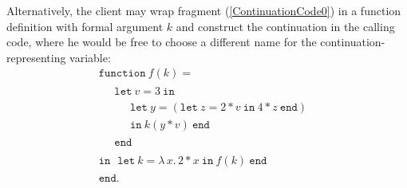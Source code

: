 Alternatively, the client may wrap fragment (\ref{ContinuationCode0})
in a function definition with formal argument $k$ and construct the
continuation in the calling code, where he would be free to choose a
different name for the continuation-representing variable:
\begin{equation}
\label{ContinuationCode1}
\begin{array}{l}
\texttt{function}\ f (k) =\\
\quad 
\begin{array}{l}
  \texttt{let}\ v = 3\ \texttt{in}\\
  \quad \begin{array}{l} 
    \texttt{let}\ y = (\texttt{let}\ z=2*v \ \texttt{in}\ 4*z\ \texttt{end})\\
    \texttt{in}\ k (y*v)\ \texttt{end}
  \end{array}\\
  \texttt{end}
  \end{array}\\
\texttt{in}\
  \begin{array}{l}
  \texttt{let}\ k = \lambda\, x .\, 2* x\ \texttt{in}\ f(k)\ \texttt{end}
  \end{array}\\
\texttt{end}.
\end{array}
\end{equation}


